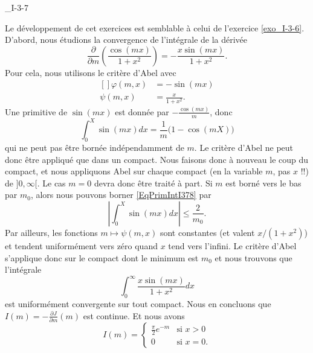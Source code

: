 

\begin{corrige}{_I-3-7}

Le développement de cet exercices est semblable à celui de l'exercice \ref{exo_I-3-6}. D'abord, nous étudions la convergence de l'intégrale de la dérivée
\begin{equation}
	\frac{ \partial  }{ \partial m }\left( \frac{ \cos(mx) }{ 1+x^2 } \right)=-\frac{ x\sin(mx) }{ 1+x^2 }.
\end{equation}
Pour cela, nous utilisons le critère d'Abel avec
\begin{equation}
	\begin{aligned}[]
		\varphi(m,x)	&=-\sin(mx)\\
		\psi(m,x)	&=\frac{ x }{ 1+x^2 }.
	\end{aligned}
\end{equation}
Une primitive de $\sin(mx)$ est donnée par $-\frac{ \cos(mx) }{ m }$, donc
\begin{equation}		\label{EqPrimIntI378}
	\int_0^X\sin(mx)dx=\frac{1}{ m }\big( 1-\cos(mX) \big)
\end{equation}
qui ne peut pas être bornée indépendamment de $m$. Le critère d'Abel ne peut donc être appliqué que dans un compact. Nous faisons donc à nouveau le coup du compact, et nous appliquons Abel sur chaque compact (en la variable $m$, pas $x$ !!) de $]0,\infty[$. Le cas $m=0$ devra donc être traité à part. Si $m$ est borné vers le bas par $m_0$, alors nous pouvons borner \eqref{EqPrimIntI378} par
\begin{equation}
	| \int_0^X\sin(mx)dx |\leq \frac{ 2 }{ m_0 }.
\end{equation}
Par ailleurs, les fonctions $m\mapsto \psi(m,x)$ sont constantes (et valent $x/(1+x^2)$) et tendent uniformément vers zéro quand $x$ tend vers l'infini. Le critère d'Abel s'applique donc sur le compact dont le minimum est $m_0$ et nous trouvons que l'intégrale
\begin{equation}
	\int_0^{\infty}\frac{ x\sin(mx) }{ 1+x^2 }dx
\end{equation}
est uniformément convergente sur tout compact. Nous en concluons que $I(m)=-\frac{ \partial J }{ \partial m }(m)$ est continue. Et nous avons
\begin{equation}
	I(m)=\begin{cases}
	\frac{ \pi }{2} e^{-m}	&	\text{si $x>0$}\\
	0	&	 \text{si $x=0$}.
\end{cases}
\end{equation}

\end{corrige}
